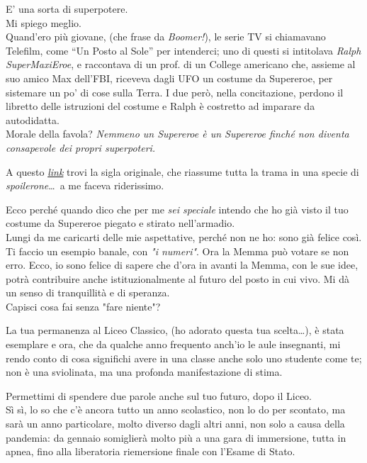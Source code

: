 \documentclass[11pt]{article}
\begin{document}
E' una sorta di superpotere.\\
Mi spiego meglio.\\
Quand’ero più giovane, (che frase da {\em Boomer!}), le serie TV si chiamavano Telefilm, come “Un Posto al Sole” per intenderci; uno di questi si intitolava {\em Ralph SuperMaxiEroe}, e raccontava di un prof. di un College americano che, assieme al suo amico Max dell’FBI, riceveva dagli UFO un costume da Supereroe, per sistemare un po’ di cose sulla Terra. I due però, nella concitazione, perdono il libretto delle istruzioni del costume e Ralph è costretto ad imparare da autodidatta.\\
Morale della favola? {\em Nemmeno un Supereroe è un Supereroe finché non diventa consapevole dei propri superpoteri.}
\begin{adjustwidth}{2cm}{}
{\small A questo \href{https://youtu.be/7JeyT7WvcOM}{\em link} trovi la sigla originale, che riassume tutta la trama in una specie di {\em spoilerone}\dots \, a me faceva riderissimo.}
\end{adjustwidth}
Ecco perché quando dico che per me {\em sei speciale} intendo che ho già visto il tuo costume da Supereroe piegato e stirato nell’armadio.\\
Lungi da me caricarti delle mie aspettative, perché non ne ho: sono già felice così.\\
Ti faccio un esempio banale, con {\em "i numeri"}. Ora la Memma può votare se non erro. Ecco, io sono felice di sapere che d’ora in avanti la Memma, con le sue idee, potrà contribuire anche istituzionalmente al futuro del posto in cui vivo.
Mi dà un senso di tranquillità e di speranza.\\ Capisci cosa fai senza "fare niente"?

La tua permanenza al Liceo Classico, (ho adorato questa tua scelta\dots ), è stata esemplare e ora, che da qualche anno frequento anch'io le aule insegnanti, mi rendo conto di cosa significhi avere in una classe anche solo uno studente come te; non è una sviolinata, ma una profonda manifestazione di stima.

Permettimi di spendere due parole anche sul tuo futuro, dopo il Liceo.\\ 
Sì sì, lo so che c'è ancora tutto un anno scolastico, non lo do per scontato, ma sarà un anno particolare, molto diverso dagli altri anni, non solo a causa della pandemia: da gennaio somiglierà molto più a una gara di immersione, tutta in apnea, fino alla liberatoria riemersione finale con l'Esame di Stato.
\end{document}
